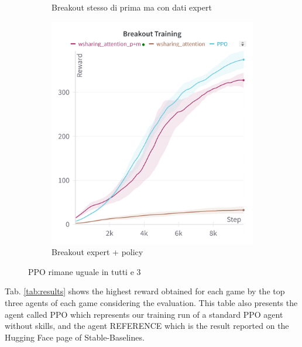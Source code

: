 \begin{figure}[htbp]
\begin{subfigure}[b]{0.32\textwidth}
        \caption{Breakout stesso di prima ma con dati expert}
        \label{fig:breakout_expert_and_policy}
    \end{subfigure}
    \hfill
    \begin{subfigure}[b]{0.32\textwidth}
        \centering
        \includegraphics[width=\textwidth]{images/breakout_p+m.png}
        \caption{Breakout expert  + policy}
        \label{fig:breakout_expert_policy_skills}
    \end{subfigure}
    \hfill

    \caption{PPO
 rimane uguale in tutti e 3}
    \label{fig:trainresults}
\end{figure}



Tab. \ref{tab:results} shows the highest reward obtained for each game by the top three agents of each game considering the evaluation. This table also presents the agent called PPO which represents our training run of a standard PPO agent without skills, and the agent REFERENCE which is the result reported on the Hugging Face page of Stable-Baselines.

